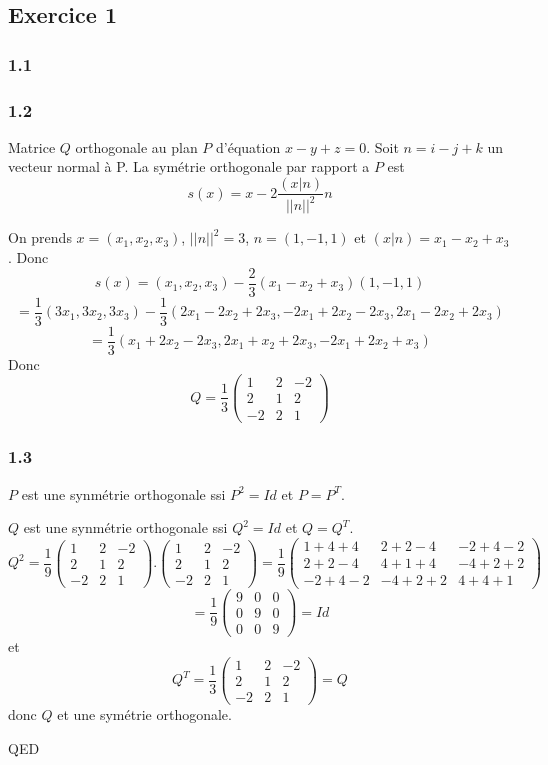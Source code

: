 \documentclass[]{book}
\theoremstyle{definition}
\begin{document}
\subsection*{Exercice 1}
\subsubsection*{1.1}



\subsubsection*{1.2}
Matrice $Q$ orthogonale au plan $P$ d'\'equation $x-y+z=0$.
Soit $n = i-j+k$ un vecteur normal \`a P. La sym\'etrie orthogonale par rapport a $P$ est 
$$s(x) = x -2 \frac{(x|n)}{||n||^2}n$$

On prends $x=(x_1, x_2, x_3)$,  $||n||^2 = 3$, $n=(1,-1,1)$ et $(x|n) = x_1-x_2+x_3$. Donc
$$s(x) = (x_1, x_2, x_3) - \frac{2}{3}(x_1-x_2+x_3)(1,-1,1) $$
$$ = \frac{1}{3}(3x_1, 3x_2, 3x_3) - \frac{1}{3} (2x_1-2x_2+2x_3, -2x_1+2x_2-2x_3, 2x_1-2x_2+2x_3)$$
$$ = \frac{1}{3}(x_1+2x_2-2x_3, 2x_1+x_2+2x_3, -2x_1+2x_2+x_3)$$
Donc
$$ Q = \frac{1}{3}\begin{pmatrix} 1 & 2 & -2 \\ 2 & 1 & 2 \\ -2 & 2 & 1 \end{pmatrix} $$


\subsubsection*{1.3}
$P$ est une synm\'etrie orthogonale ssi $P^2 = Id$ et $P=P^T$.

$Q$ est une synm\'etrie orthogonale ssi $Q^2 = Id$ et $Q=Q^T$.
$$Q^2 = \frac{1}{9}\begin{pmatrix} 1 & 2 & -2 \\ 2 & 1 & 2 \\ -2 & 2 & 1 \end{pmatrix}.\begin{pmatrix} 1 & 2 & -2 \\ 2 & 1 & 2 \\ -2 & 2 & 1 \end{pmatrix} = \frac{1}{9}\begin{pmatrix} 1+4+4 & 2+2-4 & -2+4-2 \\ 2+2-4 & 4+1+4 & -4+2+2 \\ -2+4-2 & -4+2+2 & 4+4+1 \end{pmatrix} $$
$$= \frac{1}{9}\begin{pmatrix} 9 & 0 & 0 \\ 0 & 9 & 0 \\ 0 & 0 & 9 \end{pmatrix} = Id$$
et 
$$Q^T = \frac{1}{3}\begin{pmatrix} 1 & 2 & -2 \\ 2 & 1 & 2 \\ -2 & 2 & 1 \end{pmatrix} = Q$$
donc
$Q$ et une sym\'etrie orthogonale.

QED
\end{document}
